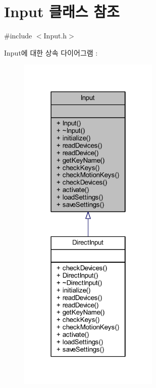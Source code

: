 \hypertarget{class_input}{}\section{Input 클래스 참조}
\label{class_input}


{\ttfamily \#include $<$Input.\+h$>$}



Input에 대한 상속 다이어그램 \+: \nopagebreak
\begin{figure}[H]
\begin{center}
\leavevmode
\includegraphics[width=190pt]{class_input__inherit__graph}
\end{center}
\end{figure}


